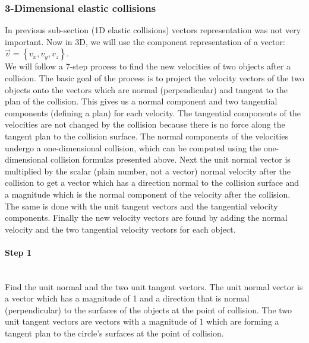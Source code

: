 \subsubsection{3-Dimensional elastic collisions}
In previous sub-section (1D elastic collisions) vectors representation was not very important.
Now in 3D, we will use the component representation of a vector: $\vec{v} = \left\{ v_x, v_y, v_z \right\}$.\\

We will follow a 7-step process to find the new velocities of two objects after a collision. 
The basic goal of the process is to project the velocity vectors of the two objects onto the vectors which are normal (perpendicular) and tangent to the plan of the collision. 
This gives us a normal component and two tangential components (defining a plan) for each velocity. 
The tangential components of the velocities are not changed by the collision because there is no force along the tangent plan to the collision surface. 
The normal components of the velocities undergo a one-dimensional collision, which can be computed using the one-dimensional collision formulas presented above.
Next the unit normal vector is multiplied by the scalar (plain number, not a vector) normal velocity after the collision to get a vector which has a direction normal to the collision surface and a magnitude which is the normal component of the velocity after the collision. 
The same is done with the unit tangent vectors and the tangential velocity components. 
Finally the new velocity vectors are found by adding the normal velocity and the two tangential velocity vectors for each object.

\paragraph{Step 1}
~\\
Find the unit normal and the two unit tangent vectors.
The unit normal vector is a vector which has a magnitude of 1 and a direction that is normal (perpendicular) to the surfaces of the objects at the point of collision. 
The two unit tangent vectors are vectors with a magnitude of 1 which are forming a tangent plan to the circle's surfaces at the point of collision.
	
